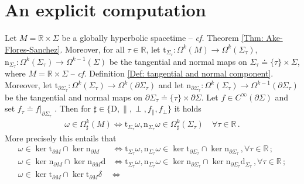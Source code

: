 
\chapter{An explicit computation} %
\label{App: an explicit decomposition}


\begin{lemm}\label{Lem: equivalence between M-boundary conditions and Sigma-boundary conditions}
	Let $M=\mathbb{R}\times\Sigma$ be a globally hyperbolic spacetime -- \textit{cf.} Theorem \ref{Thm: Ake-Flores-Sanchez}.
	Moreover, for all $\tau\in\mathbb{R}$, let $\mathrm{t}_{\Sigma_\tau}\colon\Omega^k(M)\to\Omega^k(\Sigma_\tau)$, $\mathrm{n}_{\Sigma_\tau}\colon\Omega^k(\Sigma_\tau)\to\Omega^{k-1}(\Sigma)$ be the tangential and normal maps on $\Sigma_\tau\doteq\{\tau\}\times\Sigma$, where $M=\mathbb{R}\times\Sigma$ -- \textit{cf.} Definition \ref{Def: tangential and normal component}.
	Moreover, let $\mathrm{t}_{\partial\Sigma_\tau}\colon\Omega^k(\Sigma_\tau)\to\Omega^k(\partial\Sigma_\tau)$ and let $\mathrm{n}_{\partial\Sigma_\tau}\colon\Omega^k(\Sigma_\tau)\to\Omega^{k-1}(\partial\Sigma_\tau)$ be the tangential and normal maps on $\partial\Sigma_\tau\doteq\{\tau\}\times\partial\Sigma$.
	Let $f\in C^\infty(\partial\Sigma)$ and set $f_\tau\doteq f|_{\partial\Sigma_\tau}$ .
	Then for $\sharp\in\lbrace\mathrm{D},\parallel,\perp,f_\parallel,f_\perp\rbrace$ it holds
	\begin{align}\label{Eqn: equivalence between M-boundary conditions and Sigma-boundary conditions}
	\omega\in\Omega_\sharp^k(M)\Longleftrightarrow
	\mathrm{t}_{\Sigma_\tau}\omega,\mathrm{n}_{\Sigma_\tau}\omega\in\Omega_\sharp^k(\Sigma_\tau)
	\quad\forall \tau\in\mathbb{R}\,.
	\end{align}
	More precisely this entails that 
	\begin{align*}
	\omega\in\ker\mathrm{t}_{\partial M}\cap\ker\mathrm{n}_{\partial M}&\Longleftrightarrow
	\mathrm{t}_{\Sigma_\tau}\omega,\mathrm{n}_{\Sigma_\tau}\omega\in
	\ker\mathrm{t}_{\partial\Sigma_\tau}\cap\ker\mathrm{n}_{\partial\Sigma_\tau}\,,\forall \tau\in\mathbb{R}\,;\\
	\omega\in\ker\mathrm{n}_{\partial M}\cap\ker\mathrm{n}_{\partial M}\mathrm{d}&\Longleftrightarrow
	\mathrm{t}_{\Sigma_\tau}\omega,\mathrm{n}_{\Sigma_\tau}\omega\in
	\ker\mathrm{n}_{\partial\Sigma_\tau}\cap\ker\mathrm{n}_{\partial\Sigma_\tau}\mathrm{d}_{\Sigma_\tau}\,,\forall \tau\in\mathbb{R}\,;\\
	\omega\in\ker\mathrm{t}_{\partial M}\cap\ker\mathrm{t}_{\partial M}\delta&\Longleftrightarrow

\end{align*}
\end{lemm}
